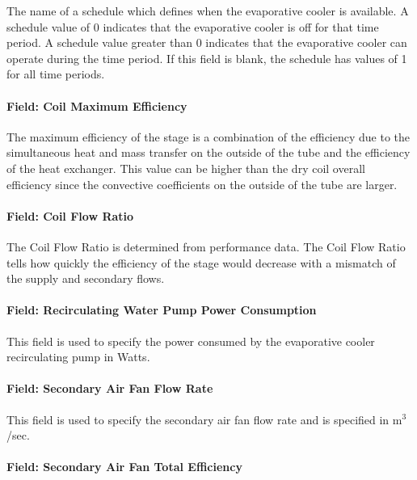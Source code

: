 The name of a schedule which defines when the evaporative cooler is available. A schedule value of 0 indicates that the evaporative cooler is off for that time period. A schedule value greater than 0 indicates that the evaporative cooler can operate during the time period. If this field is blank, the schedule has values of 1 for all time periods.

\paragraph{Field: Coil Maximum Efficiency}\label{field-coil-maximum-efficiency}

The maximum efficiency of the stage is a combination of the efficiency due to the simultaneous heat and mass transfer on the outside of the tube and the efficiency of the heat exchanger. This value can be higher than the dry coil overall efficiency since the convective coefficients on the outside of the tube are larger.

\paragraph{Field: Coil Flow Ratio}\label{field-coil-flow-ratio}

The Coil Flow Ratio is determined from performance data. The Coil Flow Ratio tells how quickly the efficiency of the stage would decrease with a mismatch of the supply and secondary flows.

\paragraph{Field: Recirculating Water Pump Power Consumption}\label{field-recirculating-water-pump-power-consumption-2}

This field is used to specify the power consumed by the evaporative cooler recirculating pump in Watts.

\paragraph{Field: Secondary Air Fan Flow Rate}\label{field-secondary-air-fan-flow-rate-1}

This field is used to specify the secondary air fan flow rate and is specified in m\(^{3}\)/sec.

\paragraph{Field: Secondary Air Fan Total Efficiency}\label{field-secondary-air-fan-total-efficiency}

